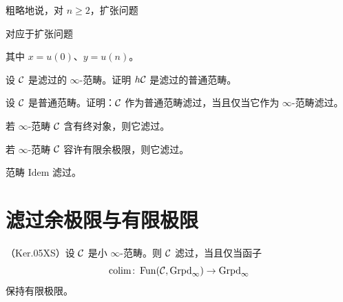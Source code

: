\begin{remark}\label{L10-2.9}
粗略地说，对 $n\ge 2$，扩张问题
\begin{center}
\end{center}
对应于扩张问题
\begin{center}
\end{center}
其中 $x=u(0)$、$y=u(n)$。
\end{remark}

\begin{exercise}\label{L10-2.10}
设 $\mathcal{C}$ 是滤过的 $\infty$-范畴。证明 $h\mathcal{C}$ 是滤过的普通范畴。
\end{exercise}

\begin{exercise}\label{L10-2.11}
设 $\mathcal{C}$ 是普通范畴。证明：$\mathcal{C}$ 作为普通范畴滤过，当且仅当它作为 $\infty$-范畴滤过。
\end{exercise}

\begin{example}\label{L10-2.12}
若 $\infty$-范畴 $\mathcal{C}$ 含有终对象，则它滤过。
\end{example}

\begin{example}\label{L10-2.13}
若 $\infty$-范畴 $\mathcal{C}$ 容许有限余极限，则它滤过。
\end{example}

\begin{exercise}\label{L10-2.14}
范畴 $\mathrm{Idem}$ 滤过。
\end{exercise}

\section{滤过余极限与有限极限}

\begin{theorem}\label{L10-3.1}
（Ker.05XS）设 $\mathcal{C}$ 是小 $\infty$-范畴。则 $\mathcal{C}$ 滤过，当且仅当函子
\[
\operatorname{colim}\colon\operatorname{Fun}(\mathcal{C},\operatorname{Grpd}_\infty)\to\operatorname{Grpd}_\infty
\]
保持有限极限。
\end{theorem}


